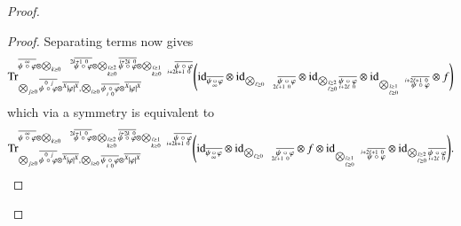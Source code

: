\documentclass{amsart}
\def\tn{\textnormal}
\def\Trace{\tn{Tr}}
\def\ol{\overline}
\def\id{\tn{id}}
\newcommand{\feeddd}[3]{{\tensor*[^{#2}_{\color{white}{!}}]{{|#1|}}{^{#3}}}}%
\theoremstyle{remark}
\theoremstyle{definition}
\begin{document}
\begin{proof}
\begin{proof}
Separating terms now gives
 \begin{align*}
  \Trace^{\ol{\psi\;\accentset{\infty}{\circ}\;\varphi}\otimes\bigotimes_{k\ge0}\quad\ol{\psi\;\accentset{2k+1\ 0\ \ \ }{\circ}\;\varphi}\otimes\bigotimes_{\substack{\scriptscriptstyle i\ge2\\ \scriptscriptstyle k\ge0}}\ol{\psi\;\accentset{i+2k\ 0}{\circ}\;\varphi}\otimes\bigotimes_{\substack{\scriptscriptstyle i\ge1\\ \scriptscriptstyle k\ge0}}\quad\ol{\psi\;\underaccent{i+2k+1\ 0\ \ \ }{\circ}\;\varphi}}_{\bigotimes_{j\ge0}\ol{\psi\;\accentset{\,0\ j}{\circ}\;\varphi}\otimes\ol{\feeddd{\varphi}{X}{X}},\bigotimes_{i\ge0}\ol{\psi\;\underaccent{\,i\ 0}{\circ}\;\varphi}\otimes\ol{\feeddd{\varphi}{X}{X}}}
\Bigg(\id_{\ol{\psi\,\underaccent{\,\infty}{\circ}\,\varphi}}\otimes\id_{\bigotimes_{\ell\ge0}\quad\ol{\psi\;\underaccent{2\ell+1\ 0\ \ \ }{\circ}\;\varphi}}\otimes \id_{\bigotimes_{\substack{\scriptscriptstyle i\ge2\\ \scriptscriptstyle \ell\ge0}}\ol{\psi\;\underaccent{i+2\ell\ 0}{\circ}\;\varphi}}\otimes \id_{\bigotimes_{\substack{\scriptscriptstyle i\ge1\\ \scriptscriptstyle \ell\ge0}}\quad\ol{\psi\;\accentset{i+2\ell+1\ 0\ \ \ }{\circ}\;\varphi}}\otimes f\Bigg)
\end{align*}
which via a symmetry is equivalent to
 \begin{align*}
  \Trace^{\ol{\psi\;\accentset{\infty}{\circ}\;\varphi}\otimes\bigotimes_{k\ge0}\quad\ol{\psi\;\accentset{2k+1\ 0\ \ \ }{\circ}\;\varphi}\otimes\bigotimes_{\substack{\scriptscriptstyle i\ge2\\ \scriptscriptstyle k\ge0}}\ol{\psi\;\accentset{i+2k\ 0}{\circ}\;\varphi}\otimes\bigotimes_{\substack{\scriptscriptstyle i\ge1\\ \scriptscriptstyle k\ge0}}\quad\ol{\psi\;\underaccent{i+2k+1\ 0\ \ \ }{\circ}\;\varphi}}_{\bigotimes_{j\ge0}\ol{\psi\;\accentset{\,0\ j}{\circ}\;\varphi}\otimes\ol{\feeddd{\varphi}{X}{X}},\bigotimes_{i\ge0}\ol{\psi\;\underaccent{\,i\ 0}{\circ}\;\varphi}\otimes\ol{\feeddd{\varphi}{X}{X}}}
\Bigg(\id_{\ol{\psi\,\underaccent{\,\infty}{\circ}\,\varphi}}\otimes\id_{\bigotimes_{\ell\ge0}\quad\ol{\psi\;\underaccent{2\ell+1\ 0\ \ \ }{\circ}\;\varphi}}\otimes f\otimes \id_{\bigotimes_{\substack{\scriptscriptstyle i\ge1\\ \scriptscriptstyle \ell\ge0}}\quad\ol{\psi\;\accentset{i+2\ell+1\ 0\ \ \ }{\circ}\;\varphi}}\otimes \id_{\bigotimes_{\substack{\scriptscriptstyle i\ge2\\ \scriptscriptstyle \ell\ge0}}\ol{\psi\;\underaccent{i+2\ell\ 0}{\circ}\;\varphi}}\Bigg).
\end{align*}


\end{proof}
\end{proof}
\end{document}
